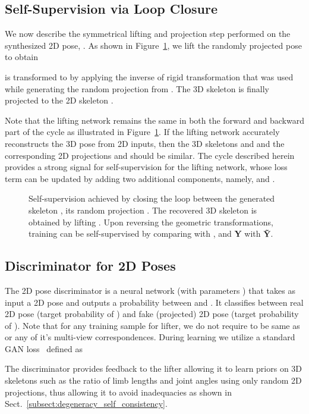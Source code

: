 \documentclass[10pt,twocolumn,letterpaper]{article}
\begin{document}
\subsection{Self-Supervision via Loop Closure}
\label{subsect:cycle-loss}
We now describe the symmetrical lifting and projection step performed on the synthesized 2D pose, . As shown in Figure~\ref{fig:cycle-loss-fig}, we lift the randomly projected pose  to obtain 

 is transformed to  by applying the inverse of rigid transformation  that was used while generating the random projection  from . The 3D skeleton  is finally projected to the 2D skeleton .

Note that the lifting network  remains the same in both the forward and backward part of the cycle as illustrated in Figure~\ref{fig:cycle-loss-fig}. If the lifting network accurately reconstructs the 3D pose from 2D inputs, then the 3D skeletons  and  and the corresponding 2D projections  and  should be similar. The cycle described herein provides a strong signal for self-supervision for the lifting network, whose loss term can be updated by adding two additional components, namely,  and .


\begin{figure}

\caption{Self-supervision achieved by closing the loop between the generated skeleton , its random projection . The recovered 3D skeleton  is obtained by lifting . Upon reversing the geometric transformations, training can be self-supervised by comparing  with , and \textbf{Y} with \textbf{\~Y}.}
\label{fig:cycle-loss-fig}
\end{figure}

\subsection{Discriminator for 2D Poses}
\label{subsect:discriminator}
The 2D pose discriminator  is a neural network (with parameters ) that takes as input a 2D pose and outputs a probability between  and . It classifies between real 2D pose  (target probability of ) and fake (projected) 2D pose  (target probability of ).
Note that for any training sample  for lifter, we do {not} require  to be same as  or any of it's multi-view correspondences. During learning we utilize a standard GAN loss~\cite{GAN} defined as

The discriminator provides feedback to the lifter allowing it to learn priors on 3D skeletons such as the ratio of limb lengths and joint angles using only random 2D projections, thus allowing it to avoid inadequacies as shown in Sect.~\ref{subsect:degeneracy_self_consistency}.
\end{document}
